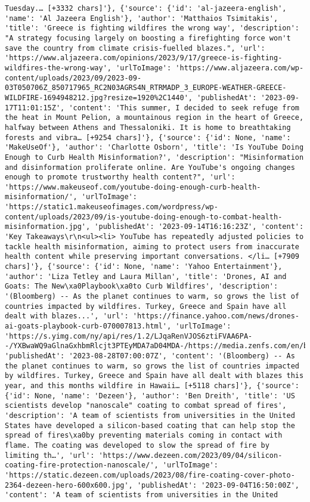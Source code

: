 \documentclass[
  letterpaper,
  DIV=11,
  numbers=noendperiod]{scrartcl}
\begin{document}
\begin{verbatim}
Tuesday.… [+3332 chars]'}, {'source': {'id': 'al-jazeera-english', 'name': 'Al Jazeera English'}, 'author': 'Matthaios Tsimitakis', 'title': 'Greece is fighting wildfires the wrong way', 'description': "A strategy focusing largely on boosting a firefighting force won't save the country from climate crisis-fuelled blazes.", 'url': 'https://www.aljazeera.com/opinions/2023/9/17/greece-is-fighting-wildfires-the-wrong-way', 'urlToImage': 'https://www.aljazeera.com/wp-content/uploads/2023/09/2023-09-03T050706Z_850717965_RC2N03AGRS4N_RTRMADP_3_EUROPE-WEATHER-GREECE-WILDFIRE-1694948212.jpg?resize=1920%2C1440', 'publishedAt': '2023-09-17T11:01:15Z', 'content': 'This summer, I decided to seek refuge from the heat in Mount Pelion, a mountainous region in the heart of Greece, halfway between Athens and Thessaloniki. It is home to breathtaking forests and vibra… [+9254 chars]'}, {'source': {'id': None, 'name': 'MakeUseOf'}, 'author': 'Charlotte Osborn', 'title': 'Is YouTube Doing Enough to Curb Health Misinformation?', 'description': "Misinformation and disinformation proliferate online. Are YouTube's ongoing changes enough to promote trustworthy health content?", 'url': 'https://www.makeuseof.com/youtube-doing-enough-curb-health-misinformation/', 'urlToImage': 'https://static1.makeuseofimages.com/wordpress/wp-content/uploads/2023/09/is-youtube-doing-enough-to-combat-health-misinformation.jpg', 'publishedAt': '2023-09-14T16:16:23Z', 'content': 'Key Takeaways\r\n<ul><li> YouTube has repeatedly adjusted policies to tackle health misinformation, aiming to protect users from inaccurate health content while preserving important conversations. </li… [+7909 chars]'}, {'source': {'id': None, 'name': 'Yahoo Entertainment'}, 'author': 'Liza Tetley and Laura Millan', 'title': 'Drones, AI and Goats: The New\xa0Playbook\xa0to Curb Wildfires', 'description': '(Bloomberg) -- As the planet continues to warm, so grows the list of countries impacted by wildfires. Turkey, Greece and Spain have all dealt with blazes...', 'url': 'https://finance.yahoo.com/news/drones-ai-goats-playbook-curb-070007813.html', 'urlToImage': 'https://s.yimg.com/ny/api/res/1.2/LJqaRenVJOS6ztiFVAA6PA--/YXBwaWQ9aGlnaGxhbmRlcjt3PTEyMDA7aD04MDA-/https://media.zenfs.com/en/bloomberg_technology_68/298191eb24ad4199b7839ec39034c12a', 'publishedAt': '2023-08-28T07:00:07Z', 'content': '(Bloomberg) -- As the planet continues to warm, so grows the list of countries impacted by wildfires. Turkey, Greece and Spain have all dealt with blazes this year, and this months wildfire in Hawaii… [+5118 chars]'}, {'source': {'id': None, 'name': 'Dezeen'}, 'author': 'Ben Dreith', 'title': 'US scientists develop "nanoscale" coating to combat spread of fires', 'description': 'A team of scientists from universities in the United States have developed a silicon-based coating that can help stop the spread of fires\xa0by preventing materials coming in contact with flame. The coating was developed to slow the spread of fire by limiting th…', 'url': 'https://www.dezeen.com/2023/09/04/silicon-coating-fire-protection-nanoscale/', 'urlToImage': 'https://static.dezeen.com/uploads/2023/08/fire-coating-cover-photo-2364-dezeen-hero-600x600.jpg', 'publishedAt': '2023-09-04T16:50:00Z', 'content': 'A team of scientists from universities in the United 
\end{verbatim}
\end{document}
